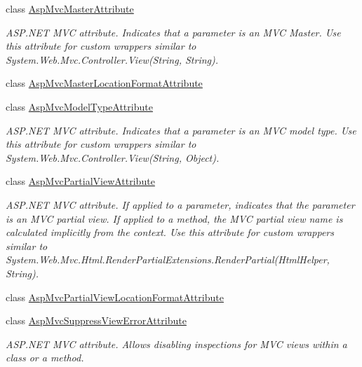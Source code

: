 \begin{DoxyCompactItemize}
class \mbox{\hyperlink{class_r_f_storage_1_1_asp_mvc_master_attribute}{Asp\+Mvc\+Master\+Attribute}}
\begin{DoxyCompactList}\small\item\em A\+S\+P.\+N\+ET M\+VC attribute. Indicates that a parameter is an M\+VC Master. Use this attribute for custom wrappers similar to {\ttfamily System.\+Web.\+Mvc.\+Controller.\+View(\+String, String)}. \end{DoxyCompactList}\item 
class \mbox{\hyperlink{class_r_f_storage_1_1_asp_mvc_master_location_format_attribute}{Asp\+Mvc\+Master\+Location\+Format\+Attribute}}
\item 
class \mbox{\hyperlink{class_r_f_storage_1_1_asp_mvc_model_type_attribute}{Asp\+Mvc\+Model\+Type\+Attribute}}
\begin{DoxyCompactList}\small\item\em A\+S\+P.\+N\+ET M\+VC attribute. Indicates that a parameter is an M\+VC model type. Use this attribute for custom wrappers similar to {\ttfamily System.\+Web.\+Mvc.\+Controller.\+View(\+String, Object)}. \end{DoxyCompactList}\item 
class \mbox{\hyperlink{class_r_f_storage_1_1_asp_mvc_partial_view_attribute}{Asp\+Mvc\+Partial\+View\+Attribute}}
\begin{DoxyCompactList}\small\item\em A\+S\+P.\+N\+ET M\+VC attribute. If applied to a parameter, indicates that the parameter is an M\+VC partial view. If applied to a method, the M\+VC partial view name is calculated implicitly from the context. Use this attribute for custom wrappers similar to {\ttfamily System.\+Web.\+Mvc.\+Html.\+Render\+Partial\+Extensions.\+Render\+Partial(\+Html\+Helper, String)}. \end{DoxyCompactList}\item 
class \mbox{\hyperlink{class_r_f_storage_1_1_asp_mvc_partial_view_location_format_attribute}{Asp\+Mvc\+Partial\+View\+Location\+Format\+Attribute}}
\item 
class \mbox{\hyperlink{class_r_f_storage_1_1_asp_mvc_suppress_view_error_attribute}{Asp\+Mvc\+Suppress\+View\+Error\+Attribute}}
\begin{DoxyCompactList}\small\item\em A\+S\+P.\+N\+ET M\+VC attribute. Allows disabling inspections for M\+VC views within a class or a method. \end{DoxyCompactList}\item 

\end{DoxyCompactItemize}

